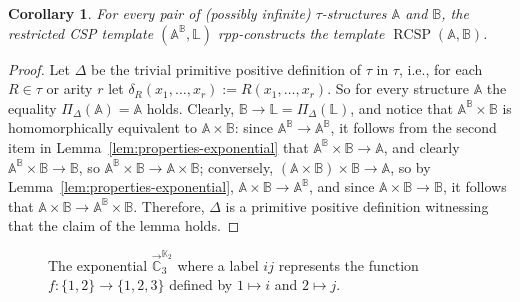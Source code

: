 \documentclass{article}
\newtheorem{corollary}[theorem]{Corollary}
\theoremstyle{definition}
\theoremstyle{remark}
\DeclareMathOperator{\RCSP}{RCSP}
\newcommand{\bA}{{\mathbb A}}
\newcommand{\bB}{{\mathbb B}}
\newcommand{\bC}{{\mathbb C}}
\newcommand{\bK}{{\mathbb K}}
\newcommand{\bL}{{\mathbb L}}
\begin{document}
\begin{corollary}\label{cor:exponential-solution}
    For every pair of (possibly infinite) $\tau$-structures $\bA$ and $\bB$,
    the restricted CSP template $(\bA^\bB,\bL)$ rpp-constructs the template $\RCSP(\bA,\bB)$.
\end{corollary}
\begin{proof}
    Let $\Delta$ be the trivial primitive positive definition of $\tau$ in $\tau$, 
    i.e., for each $R\in\tau$ or arity $r$ let $\delta_R(x_1,\dots, x_r):=R(x_1,\dots, x_r)$.
    So for every structure $\bA$ the equality $\Pi_\Delta(\bA) = \bA$ holds.
    Clearly, $\bB\to \bL = \Pi_\Delta(\bL)$, and notice that $\bA^\bB\times \bB$ is homomorphically
    equivalent to $\bA\times \bB$: since $\bA^\bB\to \bA^\bB$, it follows from the second
    item in Lemma~\ref{lem:properties-exponential} that $\bA^\bB\times \bB \to \bA$,
    and clearly $\bA^\bB\times \bB \to \bB$, so $\bA^\bB\times \bB \to \bA\times \bB$; 
    conversely, $(\bA\times \bB) \times \bB \to \bA$, so by Lemma~\ref{lem:properties-exponential},
    $\bA\times \bB\to \bA^\bB$, and since $\bA\times \bB\to \bB$, it follows that $\bA\times \bB\to 
    \bA^\bB\times \bB$. Therefore, $\Delta$ is a primitive positive definition witnessing
    that the claim of the lemma holds.
\end{proof}

\begin{figure}[ht!]
\centering
{}
\caption{The exponential $\vec{\bC}_3^{\bK_2}$ where a label $ij$ represents the
function $f\colon \{1,2\}\to\{1,2,3\}$ defined by $1\mapsto i$ and $2\mapsto j$.
}
\label{fig:exponential}
\end{figure}
\end{document}
